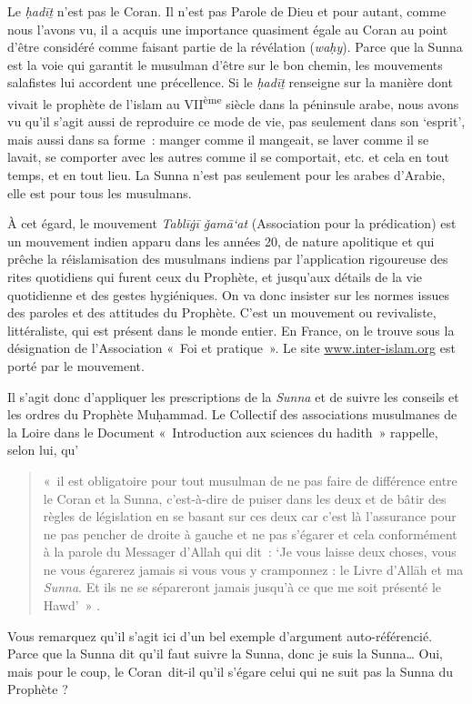 
Le \emph{ḥadīṯ} n'est pas le Coran. Il n'est pas Parole de Dieu et pour
autant, comme nous l'avons vu, il a acquis une importance quasiment
égale au Coran au point d'être considéré comme faisant partie de la
révélation (\emph{waḥy}). Parce que la Sunna est la voie qui garantit le
musulman d'être sur le bon chemin, les mouvements salafistes lui
accordent une précellence. Si le \emph{ḥadīṯ} renseigne sur la manière
dont vivait le prophète de l'islam au VII\textsuperscript{ème} siècle
dans la péninsule arabe, nous avons vu qu'il s'agit aussi de reproduire
ce mode de vie, pas seulement dans son `esprit', mais aussi dans sa
forme~: manger comme il mangeait, se laver comme il se lavait, se
comporter avec les autres comme il se comportait, etc. et cela en tout
temps, et en tout lieu. La Sunna n'est pas seulement pour les arabes
d'Arabie, elle est pour tous les musulmans.

À cet égard, le mouvement \emph{Tablīġī ǧamā`at} (Association pour la
prédication) est un mouvement indien apparu dans les années 20, de
nature apolitique et qui prêche la réislamisation des musulmans indiens
par l'application rigoureuse des rites quotidiens qui furent ceux du
Prophète, et jusqu'aux détails de la vie quotidienne et des gestes
hygiéniques. On va donc insister sur les normes issues des paroles et
des attitudes du Prophète. C'est un mouvement ou revivaliste,
littéraliste, qui est présent dans le monde entier. En France, on le
trouve sous la désignation de l'Association «~Foi et pratique~». Le site
\url{www.inter-islam.org}
est porté par le mouvement.

Il s'agit donc d'appliquer les prescriptions de la \emph{Sunna} et de
suivre les conseils et les ordres du Prophète Muḥammad. Le Collectif des
associations musulmanes de la Loire dans le Document «~Introduction aux
sciences du hadith~» rappelle, selon lui, qu'

\begin{quote}
  «~il est obligatoire pour
tout musulman de ne pas faire de différence entre le Coran et la Sunna,
c'est-à-dire de puiser dans les deux et de bâtir des règles de
législation en se basant sur ces deux car c'est là l'assurance pour ne
pas pencher de droite à gauche et ne pas s'égarer et cela conformément à
la parole du Messager d'Allah qui dit~: `Je vous laisse deux choses,
vous ne vous égarerez jamais si vous vous y cramponnez : le Livre
d'Allāh et ma \emph{Sunna}. Et ils ne se sépareront jamais jusqu'à ce
que me soit présenté le Hawd'~»  .
\end{quote}
 Vous remarquez qu'il s'agit ici d'un bel exemple d'argument
auto-référencié. Parce que la Sunna dit qu'il faut suivre la Sunna, donc
je suis la Sunna\ldots{} Oui, mais pour le coup, le Coran~dit-il qu'il
s'égare celui qui ne suit pas la Sunna du Prophète ?

